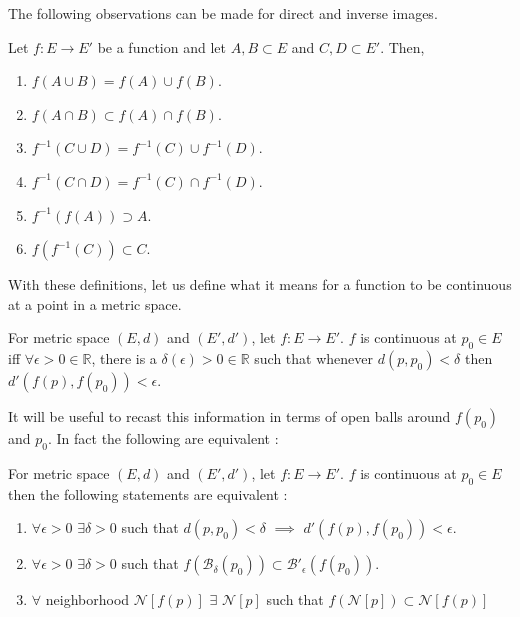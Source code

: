 The following observations can be made for direct and inverse images.
\begin{Proposition}[name=Direct and iverse image under $f$]
    Let $f : E \to E'$ be a function and let $A,B \subset E$ and $C,D \subset E'$. Then,
    \begin{enumerate}
	\item $f\left(A \cup B \right) = f(A) \cup f(B)$.
	\item $f\left(A \cap B \right) \subset f(A) \cap f(B)$.
	\item $f^{-1}\left(C \cup D \right) =  f^{-1}(C) \cup f^{-1}(D)$.
	\item $f^{-1}\left(C \cap D \right) =  f^{-1}(C) \cap f^{-1}(D)$.
	\item $f^{-1}\left(f(A)\right) \supset  A$.
	\item $f\left(f^{-1}(C)\right) \subset  C$.
    \end{enumerate}


\end{Proposition}

With these definitions, let us define what it means for a function to be continuous at a point in a
metric space.
\begin{Definition}[name=Continuous function at a point]
    For metric space $(E,d)$ and $(E',d')$, let $f : E \to E'$. $f$ is continuous at $p_0 \in E$ iff
    $\forall \epsilon > 0 \in \mathbb{R}$, there is a $\delta(\epsilon) > 0 \in \mathbb{R}$ such that 
    whenever $d(p,p_0) < \delta$ then $d'(f(p),f(p_0)) < \epsilon$.

\end{Definition}
It will be useful to recast this information in terms of open balls around $f(p_0)$ and $p_0$. In
fact the following are equivalent :
\begin{Proposition}[name=Continuous functions and mappings of open balls]
    For metric space $(E,d)$ and $(E',d')$, let $f : E \to E'$. $f$ is continuous at $p_0 \in E$ then
    the following statements are equivalent :
    \begin{enumerate}
	\item $\forall \epsilon > 0$ $\exists \delta > 0$ such that $d(p,p_0) < \delta$ $\implies$
	    $d'(f(p),f(p_0)) < \epsilon$.
	\item $\forall \epsilon > 0$ $\exists \delta > 0$ such that $f\left(\mathcal{B}_{\delta}(p_0)\right)
	    \subset \mathcal{B}'_{\epsilon}(f(p_0))$.
	\item  $\forall$ neighborhood $\mathcal{N}\left[f(p)\right]$ $\exists$ $\mathcal{N}\left[p\right]$
	    such that $f\left(\mathcal{N}\left[p\right]\right) \subset \mathcal{N}\left[f(p)\right]$
    \end{enumerate}
\end{Proposition}

